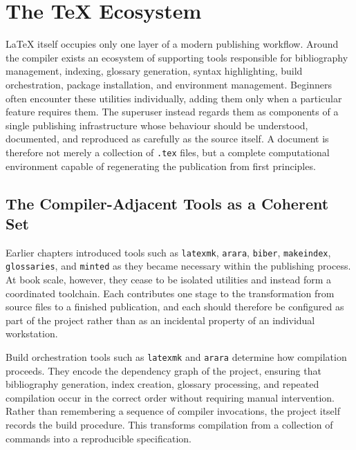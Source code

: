 \hypertarget{chapter-21-the-tex-ecosystem}{%
\chapter{The TeX Ecosystem}\label{chapter-21-the-tex-ecosystem}}

LaTeX itself occupies only one layer of a modern publishing workflow. Around the compiler exists an ecosystem of supporting tools responsible for bibliography management, indexing, glossary generation, syntax highlighting, build orchestration, package installation, and environment management. Beginners often encounter these utilities individually, adding them only when a particular feature requires them. The superuser instead regards them as components of a single publishing infrastructure whose behaviour should be understood, documented, and reproduced as carefully as the source itself. A document is therefore not merely a collection of \texttt{.tex} files, but a complete computational environment capable of regenerating the publication from first principles.

\hypertarget{the-compiler-adjacent-tools-as-a-coherent-set}{%
\section{The Compiler-Adjacent Tools as a Coherent Set}\label{the-compiler-adjacent-tools-as-a-coherent-set}}

Earlier chapters introduced tools such as \texttt{latexmk}, \texttt{arara}, \texttt{biber}, \texttt{makeindex}, \texttt{glossaries}, and \texttt{minted} as they became necessary within the publishing process. At book scale, however, they cease to be isolated utilities and instead form a coordinated toolchain. Each contributes one stage to the transformation from source files to a finished publication, and each should therefore be configured as part of the project rather than as an incidental property of an individual workstation.

Build orchestration tools such as \texttt{latexmk} and \texttt{arara} determine how compilation proceeds. They encode the dependency graph of the project, ensuring that bibliography generation, index creation, glossary processing, and repeated compilation occur in the correct order without requiring manual intervention. Rather than remembering a sequence of compiler invocations, the project itself records the build procedure. This transforms compilation from a collection of commands into a reproducible specification.

